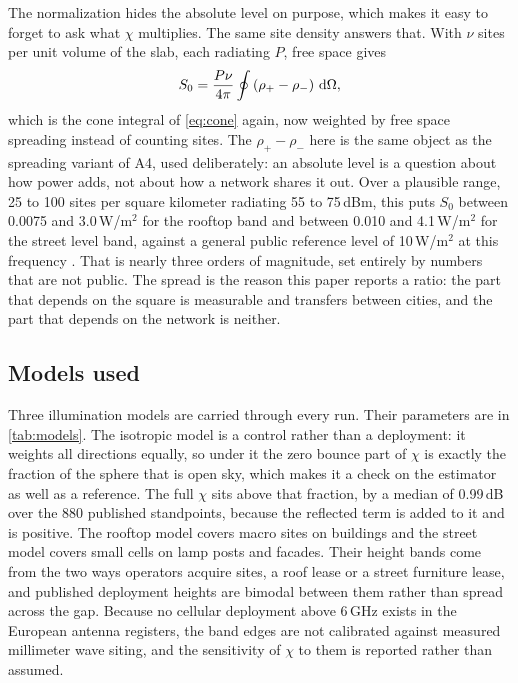 The normalization hides the absolute level on purpose, which makes it easy to
forget to ask what $\chi$ multiplies. The same site density answers that. With
$\nu$ sites per unit volume of the slab, each radiating $P$, free space gives
\begin{equation}
  S_0 = \frac{P \nu}{4\pi} \oint \left( \rho_+ - \rho_- \right) \,\mathrm{d}\Omega ,
  \label{eq:absolute}
\end{equation}
which is the cone integral of \eqref{eq:cone} again, now weighted by free space
spreading instead of counting sites. The $\rho_+ - \rho_-$ here is the same
object as the spreading variant of A4, used deliberately: an absolute level is a
question about how power adds, not about how a network shares it out. Over a
plausible range, 25 to 100 sites per
square kilometer radiating 55 to 75\,dBm, this puts $S_0$ between 0.0075 and
3.0\,W/m$^2$ for the rooftop band and between 0.010 and 4.1\,W/m$^2$ for the
street level band, against a general public reference level of 10\,W/m$^2$ at
this frequency \cite{icnirp}. That is nearly three orders of magnitude, set
entirely by numbers that are not public. The spread is the reason this paper reports a
ratio: the part that depends on the square is measurable and transfers between
cities, and the part that depends on the network is neither.

\subsection{Models used}

Three illumination models are carried through every run. Their parameters are in
\cref{tab:models}. The isotropic model is a control rather than a deployment: it
weights all directions equally, so under it the zero bounce part of $\chi$ is
exactly the fraction of the sphere that is open sky, which makes it a check on
the estimator as well as a reference. The full $\chi$ sits above that fraction,
by a median of 0.99\,dB over the 880 published standpoints, because the
reflected term is added to it and is positive. The rooftop model covers macro
sites on buildings and the street
model covers small cells on lamp posts and facades. Their height bands come from
the two ways operators acquire sites, a roof lease or a street furniture lease,
and published deployment heights are bimodal between them rather than spread
across the gap. Because no cellular deployment above 6\,GHz exists in the
European antenna registers, the band edges are not calibrated against measured
millimeter wave siting, and the sensitivity of $\chi$ to them is reported rather
than assumed.

